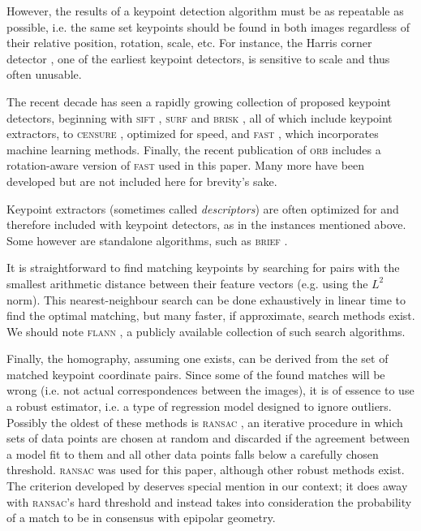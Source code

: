 \documentclass[preprint]{elsarticle}
\begin{document}
However, the results of a keypoint detection algorithm
must be as repeatable as possible, i.e. the same set keypoints should be found
in both images regardless of their relative position, rotation, scale, etc. 
For instance, the Harris corner detector \cite{Harris88}, one of the earliest
keypoint detectors, is sensitive to scale and thus often unusable.

The recent decade has seen a rapidly growing collection of proposed keypoint detectors,
beginning with \textsc{sift} \cite{Lowe04}, \textsc{surf} \cite{Bay08} and
\textsc{brisk} \cite{Leutenegger11}, all of which include keypoint extractors, to
\textsc{censure} \cite{Agrawal08}, optimized for speed, and
\textsc{fast} \cite{Rosten05}, which incorporates machine learning methods.
Finally, the recent publication of \textsc{orb} \cite{Rublee11} includes a
rotation-aware version of \textsc{fast} used in this paper. Many more have been
developed but are not included here for brevity's sake.

Keypoint extractors (sometimes called \emph{descriptors}) are often optimized
for and therefore included with keypoint detectors, as in the instances
mentioned above. Some however are standalone algorithms, such as
\textsc{brief} \cite{Calonder10}.

It is straightforward to find matching keypoints by searching for pairs
with the smallest arithmetic distance between their feature vectors (e.g. using the $L^2$ norm). This nearest-neighbour search
can be done exhaustively in linear time to find the optimal matching, but many
faster, if approximate, search methods exist. We should note \textsc{flann} \cite{Muja09},
a publicly available collection of such search algorithms.

Finally, the homography, assuming one exists, can be derived from the set of
matched keypoint coordinate pairs. Since some of the found matches will be
wrong (i.e. not actual correspondences between the images), it is of essence to use a robust estimator, i.e. a type of regression
model designed to ignore outliers. Possibly the oldest of these methods is
\textsc{ransac} \cite{Fischler81}, an iterative procedure in which sets of data points are
chosen at random and discarded if the agreement between a model fit to them and
all other data points falls below a carefully chosen threshold. \textsc{ransac} was used
for this paper, although other robust methods exist. The criterion developed by
 \citet{Moisan04} deserves special mention in our context; it does away with
\textsc{ransac}'s hard threshold and instead takes into consideration the probability of
a match to be in consensus with epipolar geometry.
\end{document}
